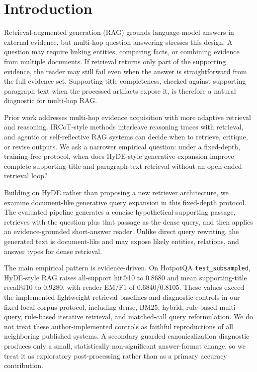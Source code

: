 \section{Introduction}
\label{sec:introduction}

Retrieval-augmented generation (RAG) grounds language-model answers in external evidence, but multi-hop question answering stresses this design. A question may require linking entities, comparing facts, or combining evidence from multiple documents. If retrieval returns only part of the supporting evidence, the reader may still fail even when the answer is straightforward from the full evidence set. Supporting-title completeness, checked against supporting paragraph text when the processed artifacts expose it, is therefore a natural diagnostic for multi-hop RAG.

Prior work addresses multi-hop evidence acquisition with more adaptive retrieval and reasoning. IRCoT-style methods interleave reasoning traces with retrieval, and agentic or self-reflective RAG systems can decide when to retrieve, critique, or revise outputs. We ask a narrower empirical question: under a fixed-depth, training-free protocol, when does HyDE-style generative expansion improve complete supporting-title and paragraph-text retrieval without an open-ended retrieval loop?

Building on HyDE rather than proposing a new retriever architecture, we examine document-like generative query expansion in this fixed-depth protocol. The evaluated pipeline generates a concise hypothetical supporting passage, retrieves with the question plus that passage as the dense query, and then applies an evidence-grounded short-answer reader. Unlike direct query rewriting, the generated text is document-like and may expose likely entities, relations, and answer types for dense retrieval.

The main empirical pattern is evidence-driven. On HotpotQA \texttt{test\_subsampled}, HyDE-style RAG raises all-support hit@10 to 0.8680 and mean supporting-title recall@10 to 0.9280, with reader EM/F1 of 0.6840/0.8105. These values exceed the implemented lightweight retrieval baselines and diagnostic controls in our fixed local-corpus protocol, including dense, BM25, hybrid, rule-based multi-query, rule-based iterative retrieval, and matched-call query reformulation. We do not treat these author-implemented controls as faithful reproductions of all neighboring published systems. A secondary guarded canonicalization diagnostic produces only a small, statistically non-significant answer-format change, so we treat it as exploratory post-processing rather than as a primary accuracy contribution.

